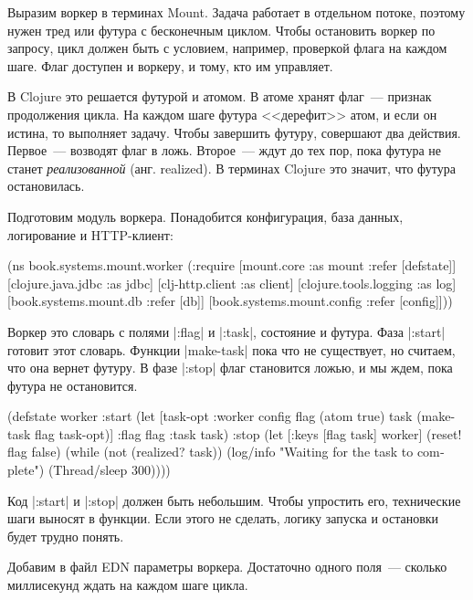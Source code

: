 Выразим воркер в терминах Mount. Задача работает в отдельном потоке, поэтому
нужен тред или футура с бесконечным циклом. Чтобы остановить воркер по запросу,
цикл должен быть с условием, например, проверкой флага на каждом шаге. Флаг
доступен и воркеру, и тому, кто им управляет.

В Clojure это решается футурой и атомом. В атоме хранят флаг~--- признак
продолжения цикла. На каждом шаге футура <<дерефит>> атом, и если он истина, то
выполняет задачу. Чтобы завершить футуру, совершают два действия. Первое~---
возводят флаг в ложь. Второе~--- ждут до тех пор, пока футура не станет
\emph{реализованной} (анг. realized). В терминах Clojure это значит, что футура
остановилась.

Подготовим модуль воркера. Понадобится конфигурация, база данных, логирование и
HTTP-клиент:

\begin{english}
  \begin{clojure}
(ns book.systems.mount.worker
  (:require
   [mount.core :as mount :refer [defstate]]
   [clojure.java.jdbc :as jdbc]
   [clj-http.client :as client]
   [clojure.tools.logging :as log]
   [book.systems.mount.db :refer [db]]
   [book.systems.mount.config :refer [config]]))
  \end{clojure}
\end{english}

Воркер это словарь с полями \spverb|:flag| и \spverb|:task|, состояние и
футура. Фаза \spverb|:start| готовит этот словарь. Функции \spverb|make-task|
пока что не существует, но считаем, что она вернет футуру. В фазе \spverb|:stop|
флаг становится ложью, и мы ждем, пока футура не остановится.

\begin{english}
  \begin{clojure}
(defstate worker
  :start
  (let [{task-opt :worker} config
        flag (atom true)
        task (make-task flag task-opt)]
    {:flag flag :task task})
  :stop
  (let [{:keys [flag task]} worker]
    (reset! flag false)
    (while (not (realized? task))
      (log/info "Waiting for the task to complete")
      (Thread/sleep 300))))
  \end{clojure}
\end{english}

Код \spverb|:start| и \spverb|:stop| должен быть небольшим. Чтобы упростить его,
технические шаги выносят в функции. Если этого не сделать, логику запуска и
остановки будет трудно понять.

Добавим в файл EDN параметры воркера. Достаточно одного поля~--- сколько
миллисекунд ждать на каждом шаге цикла.

